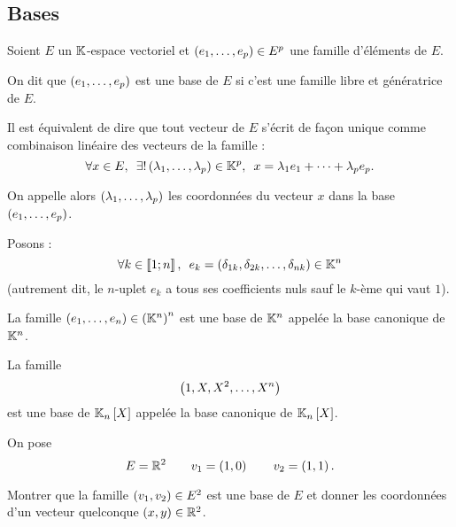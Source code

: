 \subsection{Bases}

\begin{defi}
Soient \(E\) un \(\mathbb{K}\)-espace vectoriel et \(\left(e_1,\dots,e_p\right)\in E^p\) une famille d'éléments de \(E\).

On dit que \(\left(e_1,\dots,e_p\right)\) est une base de \(E\) si c'est une famille libre et génératrice de \(E\).

Il est équivalent de dire que tout vecteur de \(E\) s'écrit de façon unique comme combinaison linéaire des vecteurs de la famille : \[\quantifs{\forall x\in E;\exists!\paren{\lambda_1,\dots,\lambda_p}\in\K^p}x=\lambda_1e_1+\dots+\lambda_pe_p.\]

On appelle alors \(\left(\lambda_1,\dots,\lambda_p\right)\) les coordonnées du vecteur \(x\) dans la base \(\left(e_1,\dots,e_p\right)\).
\end{defi}

\begin{ex}
Posons : \[\quantifs{\forall k\in\interventierii{1}{n}}e_k=\paren{\delta_{1k},\delta_{2k},\dots,\delta_{nk}}\in\K^n\] (autrement dit, le \(n\)-uplet \(e_k\) a tous ses coefficients nuls sauf le \(k\)-ème qui vaut \(1\)).

La famille \(\left(e_1,\dots,e_n\right)\in\left(\mathbb{K}^n\right)^n\) est une base de \(\mathbb{K}^n\) appelée la base canonique de \(\mathbb{K}^n\).
\end{ex}

\begin{ex}
La famille \[\left(1,X,X^2,\dots,X^n\right)\] est une base de \(\polydeg{n}\) appelée la base canonique de \(\polydeg{n}\).
\end{ex}

\begin{exoex}
On pose \[E=\mathbb{R}^2\qquad v_1=\left(1,0\right)\qquad v_2=\left(1,1\right).\]

Montrer que la famille \(\left(v_1,v_2\right)\in E^2\) est une base de \(E\) et donner les coordonnées d'un vecteur quelconque \(\left(x,y\right)\in\mathbb{R}^2\).
\end{exoex}

